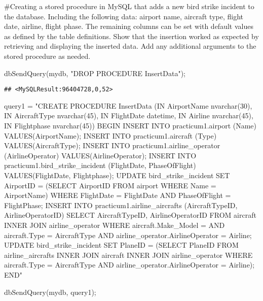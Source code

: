 \documentclass[
]{article}
\newenvironment{Shaded}{\begin{snugshade}}{\end{snugshade}}
\newcommand{\FunctionTok}[1]{\textcolor[rgb]{0.00,0.00,0.00}{#1}}
\newcommand{\NormalTok}[1]{#1}
\newcommand{\OtherTok}[1]{\textcolor[rgb]{0.56,0.35,0.01}{#1}}
\newcommand{\StringTok}[1]{\textcolor[rgb]{0.31,0.60,0.02}{#1}}
\begin{document}
\#Creating a stored procedure in MySQL that adds a new bird strike
incident to the database. Including the following data: airport name,
aircraft type, flight date, airline, flight phase. The remaining columns
can be set with default values as defined by the table definitions. Show
that the insertion worked as expected by retrieving and displaying the
inserted data. Add any additional arguments to the stored procedure as
needed.

\begin{Shaded}
\begin{Highlighting}[]
\FunctionTok{dbSendQuery}\NormalTok{(mydb, }\StringTok{"DROP PROCEDURE InsertData"}\NormalTok{);}
\end{Highlighting}
\end{Shaded}

\begin{verbatim}
## <MySQLResult:96404728,0,52>
\end{verbatim}

\begin{Shaded}
\begin{Highlighting}[]
\NormalTok{query1 }\OtherTok{=} \StringTok{"CREATE PROCEDURE InsertData (IN AirportName nvarchar(30), IN AircraftType nvarchar(45), IN FlightDate datetime, IN Airline nvarchar(45), IN Flightphase nvarchar(45))}
\StringTok{BEGIN}
\StringTok{INSERT INTO practicum1.airport (\textasciigrave{}Name\textasciigrave{}) VALUES(AirportName);}
\StringTok{INSERT INTO practicum1.aircraft (\textasciigrave{}Type\textasciigrave{}) VALUES(AircraftType);}
\StringTok{INSERT INTO practicum1.airline\_operator (\textasciigrave{}AirlineOperator\textasciigrave{}) VALUES(AirlineOperator);}
\StringTok{INSERT INTO practicum1.bird\_strike\_incident (\textasciigrave{}FlightDate\textasciigrave{}, \textasciigrave{}PhaseOfFlight\textasciigrave{}) VALUES(FlightDate, Flightphase);}
\StringTok{UPDATE bird\_strike\_incident SET \textasciigrave{}AirportID\textasciigrave{} = (SELECT AirportID FROM airport WHERE Name = AirportName) WHERE \textasciigrave{}FlightDate\textasciigrave{} = FlightDate AND \textasciigrave{}PhaseOfFlight\textasciigrave{} = FlightPhase;}
\StringTok{INSERT INTO practicum1.airline\_aircrafts (\textasciigrave{}AircraftTypeID\textasciigrave{}, \textasciigrave{}AirlineOperatorID\textasciigrave{}) SELECT \textasciigrave{}AircraftTypeID\textasciigrave{}, \textasciigrave{}AirlineOperatorID\textasciigrave{} FROM aircraft INNER JOIN airline\_operator WHERE aircraft.Make\_Model = \textquotesingle{} \textquotesingle{} AND aircraft.Type = AircraftType AND airline\_operator.AirlineOperator = Airline;}
\StringTok{UPDATE bird\_strike\_incident SET \textasciigrave{}PlaneID\textasciigrave{} = (SELECT PlaneID FROM airline\_aircrafts INNER JOIN aircraft INNER JOIN airline\_operator WHERE aircraft.Type = AircraftType AND airline\_operator.AirlineOperator = Airline);}
\StringTok{END"}

\FunctionTok{dbSendQuery}\NormalTok{(mydb, query1);}
\end{Highlighting}
\end{Shaded}
\end{document}
